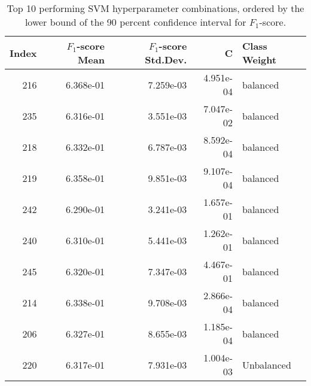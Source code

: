 \begin{table}
\caption{Top 10 performing SVM hyperparameter combinations, ordered by the lower bound of the 90 percent confidence interval for $F_1$-score.}
\label{tab:05_best_svm_hpars}
\begin{tabular}{rrrrl}
\toprule
Index & $F_1$-score Mean & $F_1$-score Std.Dev. & C & Class Weight \\
\midrule
216 & 6.368e-01 & 7.259e-03 & 4.951e-04 & balanced \\
235 & 6.316e-01 & 3.551e-03 & 7.047e-02 & balanced \\
218 & 6.332e-01 & 6.787e-03 & 8.592e-04 & balanced \\
219 & 6.358e-01 & 9.851e-03 & 9.107e-04 & balanced \\
242 & 6.290e-01 & 3.241e-03 & 1.657e-01 & balanced \\
240 & 6.310e-01 & 5.441e-03 & 1.262e-01 & balanced \\
245 & 6.320e-01 & 7.347e-03 & 4.467e-01 & balanced \\
214 & 6.338e-01 & 9.708e-03 & 2.866e-04 & balanced \\
206 & 6.327e-01 & 8.655e-03 & 1.185e-04 & balanced \\
220 & 6.317e-01 & 7.931e-03 & 1.004e-03 & Unbalanced \\
\bottomrule
\end{tabular}
\end{table}
